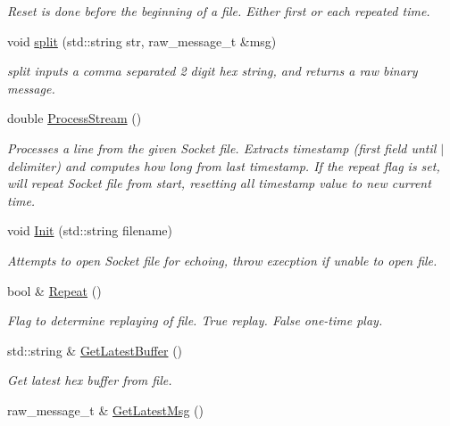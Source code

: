 \begin{DoxyCompactItemize}
\begin{DoxyCompactList}\small\item\em Reset is done before the beginning of a file. Either first or each repeated time. \end{DoxyCompactList}\item 
void \hyperlink{class_socket_parser_a738dd19a09e24169691222238832f37f}{split} (std\+::string str, raw\+\_\+message\+\_\+t \&msg)
\begin{DoxyCompactList}\small\item\em split inputs a comma separated 2 digit hex string, and returns a raw binary message. \end{DoxyCompactList}\item 
double \hyperlink{class_socket_parser_ac454e27dbe6d937aae2a2978e055256e}{Process\+Stream} ()
\begin{DoxyCompactList}\small\item\em Processes a line from the given Socket file. Extracts timestamp (first field until $\vert$ delimiter) and computes how long from last timestamp. If the repeat flag is set, will repeat Socket file from start, resetting all timestamp value to new current time. \end{DoxyCompactList}\item 
void \hyperlink{class_socket_parser_a830a4da374464796409fb1533083f259}{Init} (std\+::string filename)
\begin{DoxyCompactList}\small\item\em Attempts to open Socket file for echoing, throw execption if unable to open file. \end{DoxyCompactList}\item 
bool \& \hyperlink{class_socket_parser_ab38f2baf9998a5db15c98f3363765828}{Repeat} ()
\begin{DoxyCompactList}\small\item\em Flag to determine replaying of file. True replay. False one-\/time play. \end{DoxyCompactList}\item 
\hypertarget{class_socket_parser_a3c74873b4424df3edad77afb80d4f16c}{}std\+::string \& \hyperlink{class_socket_parser_a3c74873b4424df3edad77afb80d4f16c}{Get\+Latest\+Buffer} ()\label{class_socket_parser_a3c74873b4424df3edad77afb80d4f16c}

\begin{DoxyCompactList}\small\item\em Get latest hex buffer from file. \end{DoxyCompactList}\item 
\hypertarget{class_socket_parser_a21562743a825b3e6fc9664db3111fa75}{}raw\+\_\+message\+\_\+t \& \hyperlink{class_socket_parser_a21562743a825b3e6fc9664db3111fa75}{Get\+Latest\+Msg} ()\label{class_socket_parser_a21562743a825b3e6fc9664db3111fa75}


\end{DoxyCompactItemize}
